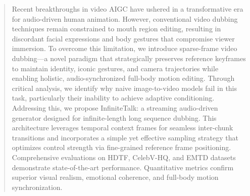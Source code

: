 \begin{abstract}
Recent breakthroughs in video AIGC have ushered in a transformative era for audio-driven human animation. However, conventional video dubbing techniques remain constrained to mouth region editing, resulting in discordant facial expressions and body gestures that compromise viewer immersion. To overcome this limitation, we introduce sparse-frame video dubbing—a novel paradigm that strategically preserves reference keyframes to maintain identity, iconic gestures, and camera trajectories while enabling holistic, audio-synchronized full-body motion editing. Through critical analysis, we identify why naive image-to-video models fail in this task, particularly their inability to achieve adaptive conditioning. Addressing this, we propose InfiniteTalk: a streaming audio-driven generator designed for infinite-length long sequence dubbing. This architecture leverages temporal context frames for seamless inter-chunk transitions and incorporates a simple yet effective sampling strategy that optimizes control strength via fine-grained reference frame positioning. Comprehensive evaluations on HDTF, CelebV-HQ, and EMTD datasets demonstrate state-of-the-art performance. Quantitative metrics confirm superior visual realism, emotional coherence, and full-body motion synchronization.
\end{abstract}